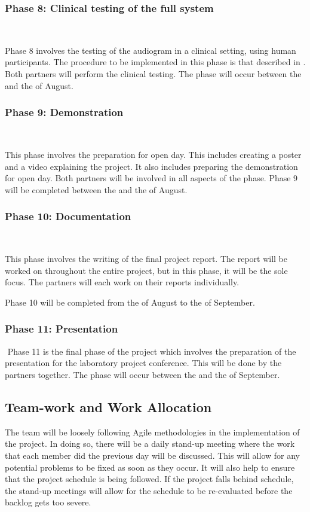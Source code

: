 \documentclass[10pt,twocolumn]{witseiepaper}
\begin{document}
\subsubsection*{Phase 8: Clinical testing of the full system} $    $

Phase 8 involves the testing of the audiogram in a clinical setting, using human participants. The procedure to be implemented in this phase is that described in . Both partners will perform the clinical testing. The phase will occur between the  and the  of August.

\subsubsection*{Phase 9: Demonstration} $    $

This phase involves the preparation for open day. This includes creating a poster and a video explaining the project. It also includes preparing the demonstration for open day. Both partners will be involved in all aspects of the phase. Phase 9 will be completed between the  and the  of August.

\subsubsection*{Phase 10: Documentation} $    $

This phase involves the writing of the final project report. The report will be worked on throughout the entire project, but in this phase, it will be the sole focus. The partners will each work on their reports individually. 

Phase 10 will be completed from the  of August to the  of September.

\subsubsection*{Phase 11: Presentation} $    $
Phase 11 is the final phase of the project which involves the preparation of the presentation for the laboratory project conference. This will be done by the partners together. The phase will occur between the  and the  of September.

\subsection{Team-work and Work Allocation}

The team will be loosely following Agile methodologies in the implementation of the project. In doing so, there will be a daily stand-up meeting where the work that each member did the previous day will be discussed. This will allow for any potential problems to be fixed as soon as they occur. It will also help to ensure that the project schedule is being followed. If the project falls behind schedule, the stand-up meetings will allow for the schedule to be re-evaluated before the backlog gets too severe.
\end{document}
